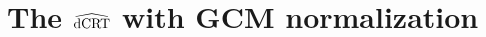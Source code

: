 \documentclass[aos]{imsart}
\theoremstyle{plain}
\theoremstyle{remark}
\newcommand{\dCRThat}{\widehat{\textnormal{dCRT}}}		%
\begin{document}
    

\clearpage

\appendix

\section{The $\dCRThat$ with GCM normalization} \label{sec:ndcrt}
\end{document}

